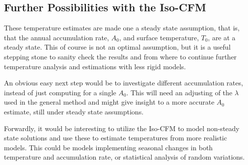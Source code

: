 \documentclass[../../CompleteThesis2/Complete_2ndDraft]{subfiles}
\begin{document}
\subsection[Iso-CFM Possibilities]{Further Possibilities with the Iso-CFM}
\label{Sec:Results_TempEstData_IsoCFMPossibilities}
These temperature estimates are made one a steady state assumption, that is, that the annual accumulation rate, $A_0$, and surface temperature, $T_0$, are at a steady state. This of course is not an optimal assumption, but it is a useful stepping stone to sanity check the results and from where to continue further temperature analysis and estimations with less rigid models.

An obvious easy next step would be to investigate different accumulation rates, instead of just computing for a single $A_0$. This will need an adjusting of the $\lambda$ used in the general method and might give insight to a more accurate $A_0$ estimate, still under steady state assumptions. 

Forwardly, it would be interesting to utilize the Iso-CFM to model non-steady state solutions and use these to estimate temperatures from more realistic models. This could be models implementing seasonal changes in both temperature and accumulation rate, or statistical analysis of random variations.
\end{document}
